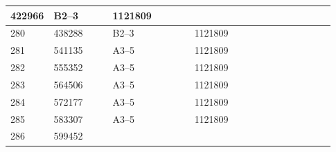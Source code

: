 \documentclass[UTF8,10pt,a4paper,fontset=fandol]{ctexart}
\newcommand{\fieldvalue}[1]{#1}
\begin{document}
\begin{center}
\begin{tabular}{|p{0.07\linewidth}|p{0.18\linewidth}|p{0.25\linewidth}|p{0.25\linewidth}|p{0.18\linewidth}|}
\fieldvalue{422966} &
\fieldvalue{B2--3} &
\fieldvalue{1121809} & \\ \hline
\fieldvalue{280} &
\fieldvalue{438288} &
\fieldvalue{B2--3} &
\fieldvalue{1121809} & \\ \hline
\fieldvalue{281} &
\fieldvalue{541135} &
\fieldvalue{A3--5} &
\fieldvalue{1121809} & \\ \hline
\fieldvalue{282} &
\fieldvalue{555352} &
\fieldvalue{A3--5} &
\fieldvalue{1121809} & \\ \hline
\fieldvalue{283} &
\fieldvalue{564506} &
\fieldvalue{A3--5} &
\fieldvalue{1121809} & \\ \hline
\fieldvalue{284} &
\fieldvalue{572177} &
\fieldvalue{A3--5} &
\fieldvalue{1121809} & \\ \hline
\fieldvalue{285} &
\fieldvalue{583307} &
\fieldvalue{A3--5} &
\fieldvalue{1121809} & \\ \hline
\fieldvalue{286} &
\fieldvalue{599452} &

\end{tabular}
\end{center}
\end{document}
